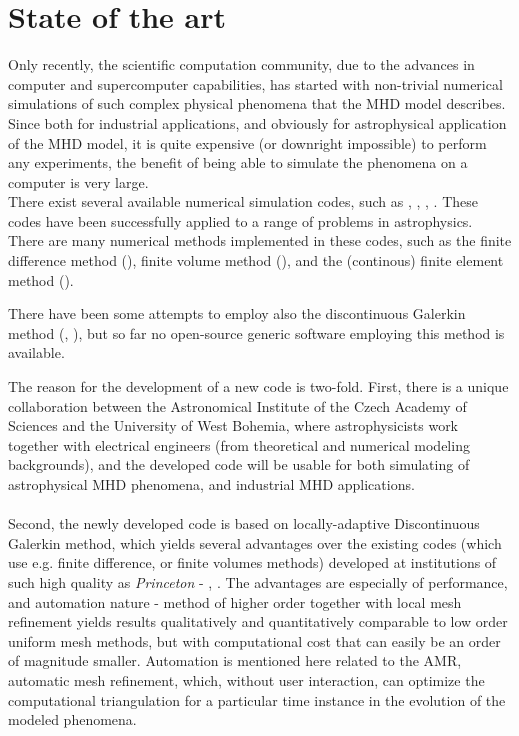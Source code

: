 \section{State of the art}
Only recently, the scientific computation community, due to the advances in computer and supercomputer capabilities, has started with non-trivial numerical simulations of such complex physical phenomena that the MHD model describes. Since both for industrial applications, and obviously for astrophysical application of the MHD model, it is quite expensive (or downright impossible) to perform any experiments, the benefit of being able to simulate the phenomena on a computer is very large.\\
There exist several available numerical simulation codes, such as \citep{athena}, \citep{zeus}, \citep{ramses}, \citep{honzaFD}. These codes have been successfully applied to a range of problems in astrophysics.\\
There are many numerical methods implemented in these codes, such as the finite difference method (\citep{honzaFD}), finite volume method (\citep{ramses}), and the (continous) finite element method (\citep{honzaFem}).

There have been some attempts to employ also the discontinuous Galerkin method (\citep{mhdDg}, \citep{mhdDg2}), but so far no open-source generic software employing this method is available.

The reason for the development of a new code is two-fold. First, there is a unique collaboration between the Astronomical Institute of the Czech Academy of Sciences and the University of West Bohemia, where astrophysicists work together with electrical engineers (from theoretical and numerical modeling backgrounds), and the developed code will be usable for both simulating of astrophysical MHD phenomena, and industrial MHD applications.
\paragraph{}
Second, the newly developed code is based on locally-adaptive Discontinuous Galerkin method, which yields several advantages over the existing codes (which use e.g. finite difference, or finite volumes methods) developed at institutions of such high quality as \emph{Princeton} - \citep{athena}, \citep{zeus}. The advantages are especially of performance, and automation nature - method of higher order together with local mesh refinement yields results qualitatively and quantitatively comparable to low order uniform mesh methods, but with computational cost that can easily be an order of magnitude smaller. Automation is mentioned here related to the AMR, automatic mesh refinement, which, without user interaction, can optimize the computational triangulation for a particular time instance in the evolution of the modeled phenomena.

